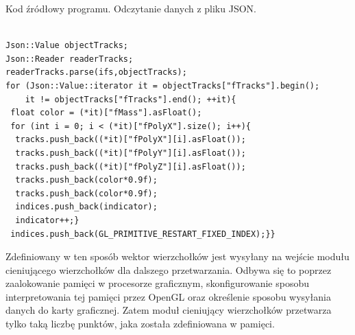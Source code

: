 \begin{table}[H]
\caption{Kod źródłowy programu. Odczytanie danych z pliku JSON.}
\label{tab6}
\begin{lstlisting}[frame=single]  % Start your code-block

Json::Value objectTracks;
Json::Reader readerTracks;
readerTracks.parse(ifs,objectTracks);
for (Json::Value::iterator it = objectTracks["fTracks"].begin(); 
	it != objectTracks["fTracks"].end(); ++it){
 float color = (*it)["fMass"].asFloat();
 for (int i = 0; i < (*it)["fPolyX"].size(); i++){
  tracks.push_back((*it)["fPolyX"][i].asFloat());
  tracks.push_back((*it)["fPolyY"][i].asFloat());
  tracks.push_back((*it)["fPolyZ"][i].asFloat());
  tracks.push_back(color*0.9f);
  tracks.push_back(color*0.9f);
  indices.push_back(indicator);
  indicator++;}
 indices.push_back(GL_PRIMITIVE_RESTART_FIXED_INDEX);}}
\end{lstlisting}
\end{table}

Zdefiniowany w ten sposób wektor wierzchołków jest wysyłany na wejście modułu cieniującego wierzchołków dla dalszego przetwarzania. Odbywa się to poprzez zaalokowanie pamięci w procesorze graficznym, skonfigurowanie sposobu interpretowania tej pamięci przez OpenGL oraz określenie sposobu wysyłania danych do karty graficznej. Zatem moduł cieniujący wierzchołków przetwarza tylko taką liczbę punktów, jaka została zdefiniowana w pamięci.

